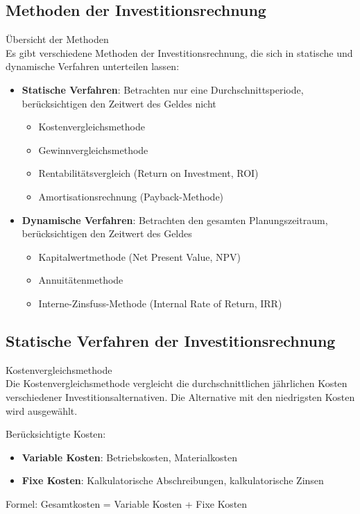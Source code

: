 \subsection{Methoden der Investitionsrechnung}

\begin{definition}{Übersicht der Methoden}\\
Es gibt verschiedene Methoden der Investitionsrechnung, die sich in statische und dynamische Verfahren unterteilen lassen:
\begin{itemize}
    \item \textbf{Statische Verfahren}: Betrachten nur eine Durchschnittsperiode, berücksichtigen den Zeitwert des Geldes nicht
    \begin{itemize}
        \item Kostenvergleichsmethode
        \item Gewinnvergleichsmethode
        \item Rentabilitätsvergleich (Return on Investment, ROI)
        \item Amortisationsrechnung (Payback-Methode)
    \end{itemize}
    \item \textbf{Dynamische Verfahren}: Betrachten den gesamten Planungszeitraum, berücksichtigen den Zeitwert des Geldes
    \begin{itemize}
        \item Kapitalwertmethode (Net Present Value, NPV)
        \item Annuitätenmethode
        \item Interne-Zinsfuss-Methode (Internal Rate of Return, IRR)
    \end{itemize}
\end{itemize}
\end{definition}

\subsection{Statische Verfahren der Investitionsrechnung}

\begin{definition}{Kostenvergleichsmethode}\\
Die Kostenvergleichsmethode vergleicht die durchschnittlichen jährlichen Kosten verschiedener Investitionsalternativen. Die Alternative mit den niedrigsten Kosten wird ausgewählt.

Berücksichtigte Kosten:
\begin{itemize}
    \item \textbf{Variable Kosten}: Betriebskosten, Materialkosten
    \item \textbf{Fixe Kosten}: Kalkulatorische Abschreibungen, kalkulatorische Zinsen
\end{itemize}

Formel: Gesamtkosten = Variable Kosten + Fixe Kosten
\end{definition}

